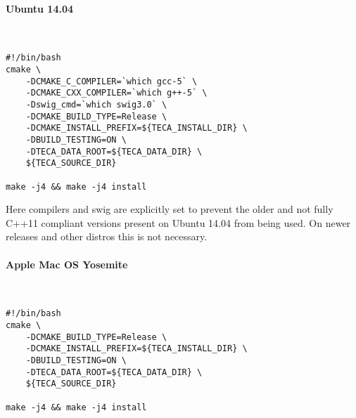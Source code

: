 \documentclass[a4paper,10pt,DIV=12]{scrreprt}
\begin{document}
\paragraph{Ubuntu 14.04} $\;$ \\ \\
\vspace{0mm}\hspace{0.2in}\begin{minipage}{0.8\textwidth}
\begin{verbatim}
#!/bin/bash
cmake \
    -DCMAKE_C_COMPILER=`which gcc-5` \
    -DCMAKE_CXX_COMPILER=`which g++-5` \
    -Dswig_cmd=`which swig3.0` \
    -DCMAKE_BUILD_TYPE=Release \
    -DCMAKE_INSTALL_PREFIX=${TECA_INSTALL_DIR} \
    -DBUILD_TESTING=ON \
    -DTECA_DATA_ROOT=${TECA_DATA_DIR} \
    ${TECA_SOURCE_DIR}

make -j4 && make -j4 install
\end{verbatim}
\end{minipage}\vspace{2mm}

\noindent Here compilers and swig are explicitly set to prevent the older and not fully C++11
compliant versions present on Ubuntu 14.04 from being used. On newer releases and other distros
this is not necessary.

\paragraph{Apple Mac OS Yosemite} $\;$ \\ \\
\vspace{0mm}\hspace{0.2in}\begin{minipage}{0.8\textwidth}
\begin{verbatim}
#!/bin/bash
cmake \
    -DCMAKE_BUILD_TYPE=Release \
    -DCMAKE_INSTALL_PREFIX=${TECA_INSTALL_DIR} \
    -DBUILD_TESTING=ON \
    -DTECA_DATA_ROOT=${TECA_DATA_DIR} \
    ${TECA_SOURCE_DIR}

make -j4 && make -j4 install
\end{verbatim}
\end{minipage}\vspace{2mm}
%
%
\end{document}

